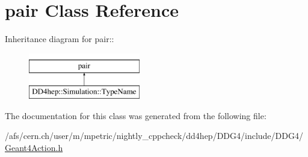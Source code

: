 \hypertarget{classstd_1_1pair}{
\section{pair Class Reference}
\label{classstd_1_1pair}
}
Inheritance diagram for pair::\begin{figure}[H]
\begin{center}
\leavevmode
\includegraphics[height=2cm]{classstd_1_1pair}
\end{center}
\end{figure}


The documentation for this class was generated from the following file:\begin{DoxyCompactItemize}
\item 
/afs/cern.ch/user/m/mpetric/nightly\_\-cppcheck/dd4hep/DDG4/include/DDG4/\hyperlink{_geant4_action_8h}{Geant4Action.h}\end{DoxyCompactItemize}
